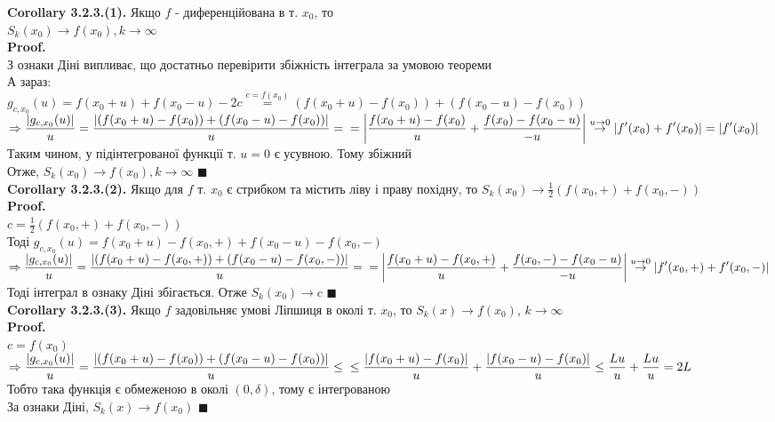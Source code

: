 \documentclass[a4paper, 10pt]{article}
\def\hugespace{\vspace{5mm} \\}
\theoremstyle{theoremdd}
\theoremstyle{theoremdd}
\theoremstyle{theoremdd}
\theoremstyle{theoremdd}
\theoremstyle{theoremdd}
\theoremstyle{theoremdd}
\theoremstyle{theoremdd}
\theoremstyle{theoremdd}
\begin{document}
\textbf{Corollary 3.2.3.(1).} Якщо $f$ - диференційована в т. $x_0$, то \\ $S_k(x_0) \to f(x_0), k \to \infty$\\
\textbf{Proof.}\\
З ознаки Діні випливає, що достатньо перевірити збіжність інтеграла за умовою теореми\\
А зараз:\\
$g_{c,x_0}(u) = f(x_0+u)+f(x_0-u) - 2c \overset{c = f(x_0)}{=} (f(x_0+u)-f(x_0))+(f(x_0-u)-f(x_0))$\\
$\displaystyle \Rightarrow \frac{\abs{g_{c,x_0}(u)}}{u} = \frac{\abs{(f(x_0+u)-f(x_0))+(f(x_0-u)-f(x_0))}}{u} = \\ = \abs{ \frac{f(x_0+u)-f(x_0)}{u} + \frac{f(x_0)-f(x_0-u)}{-u} } \overset{u \to 0}{\to} |f'(x_0)+f'(x_0)| = |f'(x_0)|$\\
Таким чином, у підінтегрованої функції т. $u=0$ є усувною. Тому збіжний\\
Отже, $S_k(x_0) \to f(x_0), k \to \infty$ $\blacksquare$
\hugespace
\textbf{Corollary 3.2.3.(2).} Якщо для $f$ т. $x_0$ є стрибком та містить ліву і праву похідну, то $\displaystyle S_k(x_0) \to \frac{1}{2} (f(x_0,+)+f(x_0,-))$\\
\textbf{Proof.}\\
$\displaystyle c = \frac{1}{2} (f(x_0,+)+f(x_0,-))$\\
Тоді $g_{c,x_0}(u) = f(x_0+u) - f(x_0,+) + f(x_0-u) - f(x_0,-)$\\
$\displaystyle \Rightarrow \frac{\abs{g_{c,x_0}(u)}}{u} = \frac{\abs{(f(x_0+u)-f(x_0,+))+(f(x_0-u)-f(x_0,-))}}{u} = \\ = \abs{ \frac{f(x_0+u)-f(x_0,+)}{u} + \frac{f(x_0,-)-f(x_0-u)}{-u} } \overset{u \to 0}{\to} |f'(x_0,+)+f'(x_0,-)|$\\
Тоді інтеграл в ознаку Діні збігається. Отже $S_k(x_0) \to c$ $\blacksquare$
\hugespace
\textbf{Corollary 3.2.3.(3).} Якщо $f$ задовільняє умові Ліпшиця в околі т. $x_0$, то $S_k(x) \to f(x_0)$, $k \to \infty$\\
\textbf{Proof.}\\
$c = f(x_0)$\\
$\displaystyle \Rightarrow \frac{\abs{g_{c,x_0}(u)}}{u} = \frac{\abs{(f(x_0+u)-f(x_0))+(f(x_0-u)-f(x_0))}}{u} \leq \\ \leq \frac{\abs{f(x_0+u)-f(x_0)}}{u} + \frac{\abs{f(x_0-u)-f(x_0)}}{u} \leq \frac{Lu}{u} + \frac{Lu}{u} = 2L$\\
Тобто така функція є обмеженою в околі $(0, \delta)$, тому є інтегрованою\\
За ознаки Діні, $S_k(x) \to f(x_0)$ $\blacksquare$
\hugespace
\end{document}
